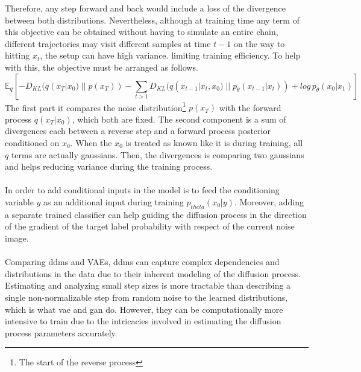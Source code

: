 \documentclass[../main.tex]{subfiles}
\begin{document}
Therefore, any step forward and back would include a loss of the divergence between both distributions. Nevertheless, although at training time any term of this objective can be obtained without having to simulate an entire chain, different trajectories may visit different samples at time $t-1$ on the way to hitting $x_t$, the setup can have high variance. limiting training efficiency. To help with this, the objective must be arranged as follows.
\begin{equation}
	\label{eq:ddm}
 \mathds{E}_q[-D_{KL}(q(x_{T}|x_0) \; || \; p(x_T)) - \sum_{t > 1} D_{KL}(q(x_{t-1} | x_t, x_0) \; || \; p_{\theta}(x_{t-1} | x_t)) + log \, p_{\theta}(x_0| x_1)]
 \end{equation}
The first part it compares the noise distribution\footnote{The start of the reverse process} $p(x_T)$ with the forward process $q(x_T|x_0)$, which both are fixed. The second component is a sum of divergences each between a reverse step and a forward process posterior conditioned on $x_0$. When the $x_0$ is treated as known like it is during training, all $q$ terms are actually gaussians. Then, the divergences is comparing two gaussians and helps reducing variance during the training process. 
\\
\\
In order to add conditional inputs in the model is to feed the conditioning variable $y$ as an additional input during training $p_{theta}(x_0 | y)$. Moreover, adding a separate trained classifier \cite{diffusion-image-synth} can help guiding the diffusion process in the direction of the gradient of the target label probability with respect of the current noise image. 
\\
\\
Comparing \gls{ddm}s and VAEs, \gls{ddm}s can capture complex dependencies and distributions in the data due to their inherent modeling of the diffusion process. Estimating and analyzing small step sizes is more tractable than describing a single non-normalizable step from random noise to the learned distributions, which is what \gls{vae} and \gls{gan} do. However, they can be computationally more intensive to train due to the intricacies involved in estimating the diffusion process parameters accurately.
\end{document}

